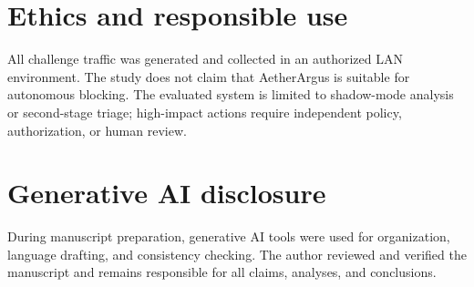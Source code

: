 \documentclass[12pt]{article}
\newcommand{\model}{AetherArgus}
\begin{document}
\section*{Ethics and responsible use}
All challenge traffic was generated and collected in an authorized LAN environment. The study does not claim that \model{} is suitable for autonomous blocking. The evaluated system is limited to shadow-mode analysis or second-stage triage; high-impact actions require independent policy, authorization, or human review.

\section*{Generative AI disclosure}
During manuscript preparation, generative AI tools were used for organization, language drafting, and consistency checking. The author reviewed and verified the manuscript and remains responsible for all claims, analyses, and conclusions.



\end{document}
